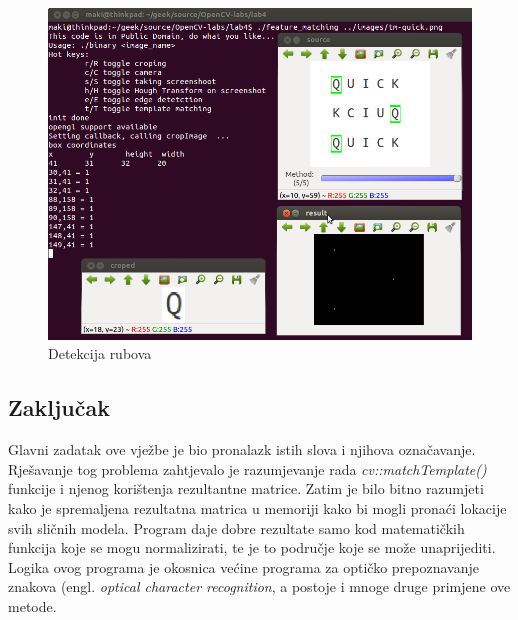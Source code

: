 \begin{figure}[h]
\centering
\includegraphics[scale=0.4]{images/lab2-01-tm.png}
\caption{Detekcija rubova}
\label{fig:lab2-01-tm}
\end{figure}

\subsection{Zaključak}
Glavni zadatak ove vježbe je bio pronalazk istih slova i njihova
označavanje.
Rješavanje tog problema zahtjevalo je razumjevanje rada
\textit{cv::matchTemplate()} funkcije i njenog korištenja rezultantne
matrice. Zatim je bilo bitno razumjeti kako je spremaljena rezultatna 
matrica u memoriji kako bi mogli pronaći lokacije svih sličnih modela.
Program daje dobre rezultate samo kod matematičkih funkcija koje se mogu
normalizirati, te je to područje koje se može unaprijediti.
Logika ovog programa je okosnica većine programa za optičko
prepoznavanje znakova (engl. \textit{optical character recognition}, a
postoje i mnoge druge primjene ove metode.
